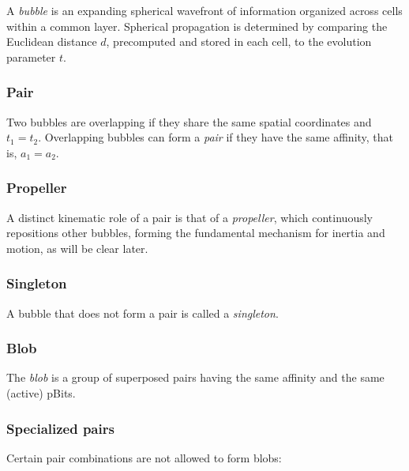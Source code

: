 \documentclass[12pt,english]{article}
\begin{document}
A \emph{bubble} is an expanding spherical wavefront of information organized across cells within a common layer. Spherical propagation is determined by comparing the Euclidean distance $d$, precomputed and stored in each cell, to the evolution parameter $t$. 

\subsubsection{Pair}
Two bubbles are overlapping if they share the same spatial coordinates and $t_1=t_2$. Overlapping bubbles can form a \emph{pair} if they have the same affinity, that is, $a_1=a_2$.

\subsubsection{Propeller} \label{subsubsec:propeller}
A distinct kinematic role of a pair is that of a \textit{propeller}, which continuously repositions other bubbles, forming the fundamental mechanism for inertia and motion, as will be clear later.

\subsubsection{Singleton}
A bubble that does not form a pair is called a \textit{singleton}.

\subsubsection{Blob}
The \textit{blob} is a group of superposed pairs having the same affinity and the same (active) pBits.

\subsubsection{Specialized pairs} \label{subsec:specialized-pairs}
Certain pair combinations are not allowed to form blobs: 
\end{document}

